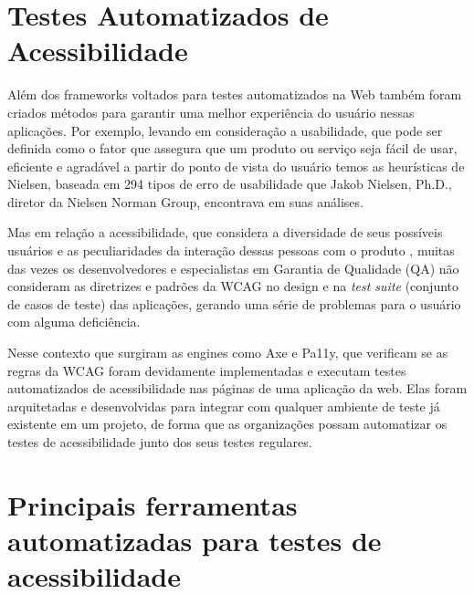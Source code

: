 \documentclass[
	12pt,				%
	openright,			%
	oneside,			%
	a4paper,			%
	chapter=TITLE,		%
	section=TITLE,		%
	subsection=TITLE,	%
	subsubsection=TITLE,%
	english,			%
	brazil				%
	]{abntex2}
\theoremstyle{definition}
\begin{document}
\section{Testes Automatizados de Acessibilidade}

Além dos frameworks voltados para testes automatizados na Web  também foram criados métodos para garantir uma melhor experiência do usuário nessas aplicações. Por exemplo, levando em consideração a usabilidade, que pode ser definida como o fator que assegura que um produto ou serviço seja fácil de usar, eficiente e agradável a partir do ponto de vista do usuário \cite{sharp2005design} temos as heurísticas de Nielsen, baseada em 294 tipos de erro de usabilidade que Jakob Nielsen, Ph.D., diretor da Nielsen Norman Group, encontrava em suas análises.

Mas em relação a acessibilidade, que considera a diversidade de seus possíveis usuários e as peculiaridades da interação dessas pessoas com o produto \cite{torres2004conteudos}, muitas das vezes os desenvolvedores e especialistas em Garantia de Qualidade (QA) não consideram as diretrizes e padrões da WCAG no design e na \textit{test suite} (conjunto de casos de teste) das aplicações, gerando uma série de problemas para o usuário com alguma deficiência.

Nesse contexto que surgiram as engines como Axe e Pa11y, que verificam se as regras da WCAG foram devidamente implementadas e executam testes automatizados de acessibilidade nas páginas de uma aplicação da web. Elas foram arquitetadas e desenvolvidas para integrar com qualquer ambiente de teste já existente em um projeto, de forma que as organizações possam automatizar os testes de acessibilidade junto dos seus testes regulares.

\section{Principais ferramentas automatizadas para testes de acessibilidade}
\label{sec:ferramentas}

\end{document}
